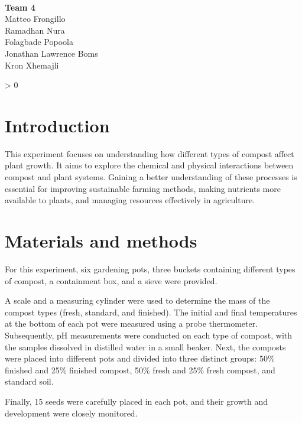 \documentclass{article}
\makeatletter
\newcommand{\wrapfill}{
    \par
    \ifnum \value{WF@wrappedlines} > 0
        \addtocounter{WF@wrappedlines}{-1}%
        \null\vspace{
            \arabic{WF@wrappedlines}
            \baselineskip
        }
        \WFclear
    \fi
    \phantom{}
}
\makeatother
\begin{document}
\phantom{}\\[-1cm]

\begin{flushright}
        \large
        \textbf{Team 4}\\
        Matteo Frongillo\\
        Ramadhan Nura\\
        Folagbade Popoola\\
        Jonathan Lawrence Boms\\
        Kron Xhemajli
\end{flushright}
\wrapfill

\tableofcontents
\pagebreak

\section{Introduction}
This experiment focuses on understanding how different types of compost affect plant
growth. It aims to explore the chemical and physical interactions between compost and
plant systems. Gaining a better understanding of these processes is essential for
improving sustainable farming methods, making nutrients more available to plants, and
managing resources effectively in agriculture.

\section{Materials and methods}
For this experiment, six gardening pots, three buckets containing different types of 
compost, a containment box, and a sieve were provided.

A scale and a measuring cylinder were used to determine the mass of the compost types
(fresh, standard, and finished). The initial and final temperatures at the bottom of each
pot were measured using a probe thermometer. Subsequently, pH measurements were conducted on each type of compost, with the samples
dissolved in distilled water in a small beaker. Next, the composts were placed into different pots and divided into three distinct
groups: 50\% finished and 25\% finished compost, 50\% fresh and 25\% fresh compost, and
standard soil.

Finally, 15 seeds were carefully placed in each pot, and their growth and development
were closely monitored.
\end{document}
